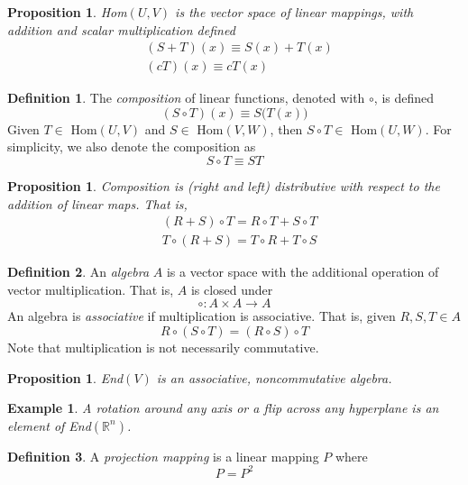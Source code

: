 \documentclass{article}
\newtheorem{proposition}[theorem]{Proposition}
\newtheorem{example}{Example}[section]
\theoremstyle{remark}
\theoremstyle{definition}
\newtheorem{definition}{Definition}[section]
\begin{document}
  \begin{proposition}
  Hom$(U, V)$ is the vector space of linear mappings, with addition and scalar multiplication defined
  \begin{align*}
      & (S + T) (x) \equiv S(x) + T(x) \\
      & (c T) (x) \equiv c T(x)
  \end{align*}
  \end{proposition}

  \begin{definition}
  The \textit{composition} of linear functions, denoted with $\circ$, is defined
  \[ (S \circ T) (x) \equiv S\big( T(x)\big) \]
  Given $T \in $ Hom$(U, V)$ and $S \in $ Hom$(V, W)$, then $S \circ T \in $ Hom$(U, W)$. For simplicity, we also denote the composition as 
  \[ S \circ T \equiv S T\]
  \end{definition}

  \begin{proposition}
  Composition is (right and left) distributive with respect to the addition of linear maps. That is, 
  \begin{align*}
      & (R + S) \circ T = R \circ T + S \circ T \\
      & T \circ (R + S) = T \circ R + T \circ S 
  \end{align*}
  \end{proposition}

  \begin{definition}
  An \textit{algebra} $A$ is a vector space with the additional operation of vector multiplication. That is, $A$ is closed under 
  \[\circ: A \times A \longrightarrow A\] 
  An algebra is \textit{associative} if multiplication is associative. That is, given $R, S, T \in A$
  \[ R \circ (S \circ T) = (R \circ S) \circ T \]
  Note that multiplication is not necessarily commutative. 
  \end{definition}

  \begin{proposition}
  End$(V)$ is an associative, noncommutative algebra. 
  \end{proposition}

  \begin{example}
  A rotation around any axis or a flip across any hyperplane is an element of End$(\mathbb{R}^n)$. 
  \end{example}

  \begin{definition}
  A \textit{projection mapping} is a linear mapping $P$ where 
  \[ P = P^2\]
  \end{definition}
\end{document}
